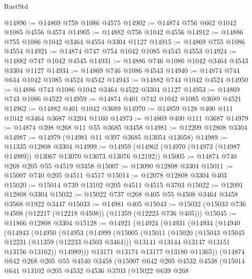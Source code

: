 \begin{lexlean}{RustStd}
\begin{coremodule}
{{{{{{{{{{{{{{{{{{{@14896 := @14869 @758 @1086 @4575
@14902 := @14874 @756 @662 @1042 @1085 @4556 @4574
@14905 := @14882 @756 @1042 @4556
@14912 := @14886 @755 @1086 @1042 @3464 @4554 @3304 @1127
@14915 := @14869 @755 @1086 @4554
@14921 := @14874 @747 @754 @1042 @1085 @4545 @4553
@14924 := @14882 @747 @1042 @4545
@14931 := @14886 @746 @1086 @1042 @3464 @4543 @3304 @1127
@14934 := @14869 @746 @1086 @4543
@14940 := @14874 @744 @644 @1042 @1085 @4524 @4542
@14943 := @14882 @744 @1042 @4524
@14950 := @14886 @743 @1086 @1042 @3464 @4522 @3304 @1127
@14953 := @14869 @743 @1086 @4522
@14959 := @14874 @401 @742 @1042 @1085 @3689 @4521
@14962 := @14882 @401 @1042 @3689
@14970 := @14859 @128 @400 @111 @1042 @3464 @3687 @3204 @1160
@14973 := @14869 @400 @111 @3687
@14979 := @14874 @398 @268 @11 @55 @3685 @3458
@14981 := @12209 @12808 @3304
@14987 := @14979 (@14981 @11 @397 @3685 @13054 @13058)
@14989 := @11335 @12808 @3304
@14999 := @14959 (@14962 (@14970 (@14973 (@14987 @14989)) @13067 @13070 @13073 @13076 @12192))
@15005 := @14874 @740 @268 @205 @55 @4519 @3458
@15007 := @13090 @12808 @3304
@15011 := @15007 @740 @205 @4511 @4517
@15014 := @12078 @12808 @3304 @403
@15020 := @15014 @739 @13102 @205 @4511 @4515 @3703
@15022 := @12091 @12808 @3304
@15032 := @15022 @737 @268 @405 @55 @4508 @3464 @3458 @3568 @1922 @3447
@15033 := @14981 @405
@15043 := @15032 (@15033 @736 @4508 (@12217 (@12218 @4508)) (@11359 (@12223 @736 @405)))
@15045 := @11866 @12808 @3304
@15128 := @14921
    (@14924
      (@14931
        (@14934
          (@14940
            (@14943
              (@14950
                (@14953
                  (@14999
                    (@15005
                      (@15011
                        (@15020
                          (@15043 @15045 @12231 (@11359 (@12233 @4503 @3464)))
                          @13141
                          @13144
                          @13147
                          @13151
                          @13156
                          @13162))
                      @14989)))
                @13171
                @13174
                @13177
                @13180
                @11365))
            (@14874
              @642
              @268
              @205
              @55
              @4540
              @3458
              (@15007
                @642
                @205
                @4532
                @4538
                (@15014
                  @641
                  @13102
                  @205
                  @4532
                  @4536
                  @3703
                  (@15022
                    @639
                    @268
}}}}}}}}}}}}}}}}}}}
\end{coremodule}
\end{lexlean}
